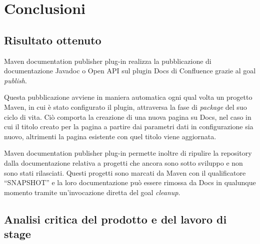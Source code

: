 
\chapter{Conclusioni}
\label{cap:conclusioni}

\section{Risultato ottenuto}

Maven documentation publisher plug-in realizza la pubblicazione di documentazione Javadoc o Open API sul plugin Docs di Confluence grazie al goal \emph{publish}.

Questa pubblicazione avviene in maniera automatica ogni qual volta un progetto Maven, in cui è stato configurato il plugin, attraversa la fase di \emph{package} del suo ciclo di vita.
Ciò comporta la creazione di una nuova pagina su Docs, nel caso in cui il titolo creato per la pagina a partire dai parametri dati in configurazione sia nuovo, altrimenti la pagina esistente con quel titolo viene aggiornata.

Maven documentation publisher plug-in permette inoltre di ripulire la repository dalla documentazione relativa a progetti che ancora sono sotto sviluppo e non sono stati rilasciati.
Questi progetti sono marcati da Maven con il qualificatore ``SNAPSHOT'' e la loro documentazione può essere rimossa da Docs in qualunque momento tramite un'invocazione diretta del goal \emph{cleanup}.

\section{Analisi critica del prodotto e del lavoro di stage}

